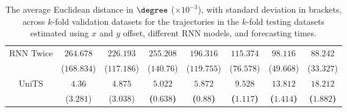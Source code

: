 \begin{table}[!ht]
{\begin{tabular}{|c|c|c|c|c|c|c|c|}
			\multirow{2}{*}{RNN Twice} & $264.678$ & $226.193$ & $255.208$ & $196.316$ & $115.374$ & $98.116$ & $88.242$ \\
			 & ($168.834$) & ($117.186$) & ($140.76$) & ($119.755$) & ($76.578$) & ($49.668$) & ($33.327$) \\ \hline
			\multirow{2}{*}{UniTS} & $4.36$ & $4.875$ & $\mathbf{5.022}$ & $\mathbf{5.872}$ & $\mathbf{9.528}$ & $\mathbf{13.812}$ & $\mathbf{18.212}$ \\
			 & ($3.281$) & ($3.038$) & \textbf{(}$\mathbf{0.638}$\textbf{)} & \textbf{(}$\mathbf{0.88}$\textbf{)} & \textbf{(}$\mathbf{1.117}$\textbf{)} & \textbf{(}$\mathbf{1.414}$\textbf{)} & \textbf{(}$\mathbf{1.882}$\textbf{)} \\ \hline
		\end{tabular}
	}
	\caption{The average Euclidean distance in $\degree$ ($\times 10^{-3}$), with standard deviation in brackets, across $k$-fold validation datasets for the trajectories in the $k$-fold testing datasets estimated using $x$ and $y$ offset, different RNN models, and forecasting times.}
	\label{tab:all_no_abs_euclid}
\end{table}

